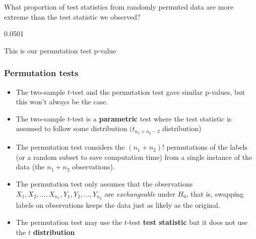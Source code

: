 \documentclass[a4paper]{article}
\begin{document}
What proportion of test statistics from randomly permuted data are more extreme than the test statistic we observed?
\begin{Schunk}
\begin{Soutput}
[1] 0.0501
\end{Soutput}
\end{Schunk}
This is our \textcolor{mygreen}{permutation test p-value}
\subsubsection{Permutation tests}
\begin{itemize}
	\item The two-sample \( t \)-test and the permutation test gave similar p-values, but this won't always be the case.
	\item The two-sample \( t \)-test is a \textcolor{myred}{\textbf{parametric}} test where the test statistic is assumed to follow some distribution \( (t_{n_{x}+n_{y}-2} \) distribution)
	\item The permutation test considers the \( (n_1 + n_2)! \) permutations of the labels (or a random subset to save computation time) from a single instance of the data (the \( n_1 + n_2 \) observations).
	\item The permutation test only assumes that the observations \( X_1,X_2,\dotsc,X_{n_x}, Y_1,Y_2,\dotsc,Y_{n_y} \) are \textit{exchangeable} under \( H_0 \), that is, swapping labels on observations keeps the data just as likely as the original.
	\item The permutation test may use the \( t \)-test \textcolor{mygreen}{\textbf{test statistic}} but it does not use the \( t \) \textbf{distribution}
\end{itemize}
\end{document}
